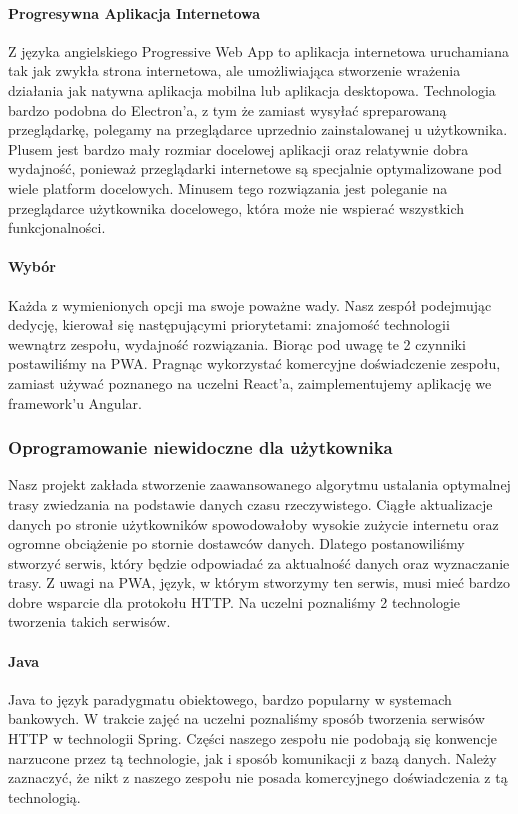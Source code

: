\paragraph{Progresywna Aplikacja Internetowa}
Z języka angielskiego Progressive Web App to aplikacja internetowa uruchamiana tak jak zwykła strona internetowa, ale umożliwiająca stworzenie wrażenia działania jak natywna aplikacja mobilna lub aplikacja desktopowa.
Technologia bardzo podobna do Electron'a, z tym że zamiast wysyłać spreparowaną przeglądarkę, polegamy na przeglądarce uprzednio zainstalowanej u użytkownika.
Plusem jest bardzo mały rozmiar docelowej aplikacji oraz relatywnie dobra wydajność, ponieważ przeglądarki internetowe są specjalnie optymalizowane pod wiele platform docelowych.
Minusem tego rozwiązania jest poleganie na przeglądarce użytkownika docelowego, która może nie wspierać wszystkich funkcjonalności.

\paragraph{Wybór}
Każda z wymienionych opcji ma swoje poważne wady.
Nasz zespół podejmując dedycję, kierował się następującymi priorytetami: znajomość technologii wewnątrz zespołu, wydajność rozwiązania.
Biorąc pod uwagę te 2 czynniki postawiliśmy na PWA.
Pragnąc wykorzystać komercyjne doświadczenie zespołu, zamiast używać poznanego na uczelni React'a, zaimplementujemy aplikację we framework'u Angular.

\subsubsection{Oprogramowanie niewidoczne dla użytkownika}
Nasz projekt zakłada stworzenie zaawansowanego algorytmu ustalania optymalnej trasy zwiedzania na podstawie danych czasu rzeczywistego.
Ciągłe aktualizacje danych po stronie użytkowników spowodowałoby wysokie zużycie internetu oraz ogromne obciążenie po stornie dostawców danych.
Dlatego postanowiliśmy stworzyć serwis, który będzie odpowiadać za aktualność danych oraz wyznaczanie trasy.
Z uwagi na PWA, język, w którym stworzymy ten serwis, musi mieć bardzo dobre wsparcie dla protokołu HTTP.
Na uczelni poznaliśmy 2 technologie tworzenia takich serwisów.

\paragraph{Java}
Java to język paradygmatu obiektowego, bardzo popularny w systemach bankowych.
W trakcie zajęć na uczelni poznaliśmy sposób tworzenia serwisów HTTP w technologii Spring.
Części naszego zespołu nie podobają się konwencje narzucone przez tą technologie, jak i sposób komunikacji z bazą danych.
Należy zaznaczyć, że nikt z naszego zespołu nie posada komercyjnego doświadczenia z tą technologią.


